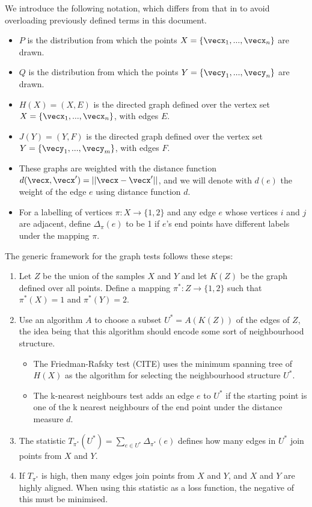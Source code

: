 We introduce the following notation, which differs from that in \cite{torchtwosample} to avoid overloading previously defined terms in this document. 

\begin{itemize}
    \item $P$ is the distribution from which the points $X = \{\vecx_1, ..., \vecx_n \}$ are drawn.
    \item $Q$ is the distribution from which the points $Y = \{\vecy_1, ..., \vecy_n \}$ are drawn.
    \item $H(X) = (X, E)$ is the directed graph defined over the vertex set $X = \{\vecx_1, ..., \vecx_n \}$, with edges $E$.
    \item $J(Y) = (Y, F) $ is the directed graph defined over the vertex set $Y = \{\vecy_1, ..., \vecy_m \}$, with edges $F$. 
    \item These graphs are weighted with the distance function $d(\vecx, \vecx') = || \vecx - \vecx'||$, and we will denote with $d(e)$ the weight of the edge $e$ using distance function $d$. 
    \item For a labelling of vertices $\pi: X \rightarrow \{1, 2\}$ and any edge $e$ whose vertices $i$ and $j$ are adjacent, define $\Delta_{\pi}(e)$ to be 1 if $e$'s end points have different labels under the mapping $\pi$. 
\end{itemize}

The generic framework for the graph tests follows these steps:

\begin{enumerate}
    \item Let $Z$ be the union of the samples $X$ and $Y$ and let $K(Z)$ be the graph defined over all points. Define a mapping $\pi^* : Z \rightarrow \{1, 2\}$ such that $\pi^*(X) = 1$ and $\pi^*(Y) = 2$.
    \item Use an algorithm $A$ to choose a subset $U^* = A(K(Z))$ of the edges of $Z$, the idea being that this algorithm should encode some sort of neighbourhood structure.
    \begin{itemize}
        \item The Friedman-Rafsky test (CITE) uses the minimum spanning tree of $H(X)$ as the algorithm for selecting the neighbourhood structure $U^*$. 

        \item The k-nearest neighbours test adds an edge $e$ to $U^*$ if the starting point is one of the k nearest neighbours of the end point under the distance measure $d$.
    \end{itemize}
    \item The statistic $T_{\pi^*}(U^*) = \sum_{e \in U^*} \Delta_{\pi^*} (e)$ defines how many edges in $U^*$ join points from $X$ and $Y$. 
    \item If $T_{\pi^*}$ is high, then many edges join points from $X$ and $Y$, and $X$ and $Y$ are highly aligned. When using this statistic as a loss function, the negative of this must be minimised.
\end{enumerate}


